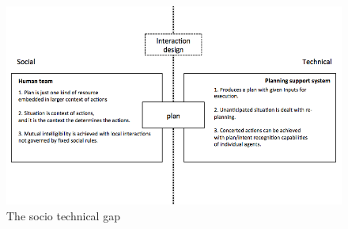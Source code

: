 \begin{figure}[h]
  \centering
  \includegraphics[width=1\textwidth]{img/approach/gap}
  \caption{The socio technical gap}
  \label{fig:gap}
\end{figure}





